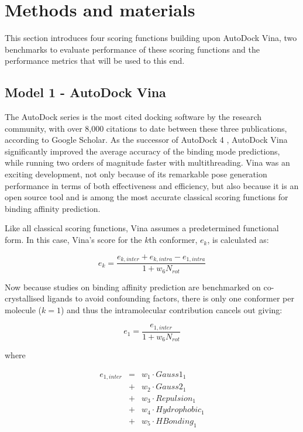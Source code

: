 \section{Methods and materials}

This section introduces four scoring functions building upon AutoDock Vina, two benchmarks to evaluate performance of these scoring functions and the performance metrics that will be used to this end.

\subsection{Model 1 - AutoDock Vina}

The AutoDock series \citep{597,596,595} is the most cited docking software by the research community, with over 8,000 citations to date between these three publications, according to Google Scholar. As the successor of AutoDock 4 \citep{596}, AutoDock Vina \citep{595} significantly improved the average accuracy of the binding mode predictions, while running two orders of magnitude faster with multithreading. Vina was an exciting development, not only because of its remarkable pose generation performance in terms of both effectiveness and efficiency, but also because it is an open source tool and is among the most accurate classical scoring functions for binding affinity prediction.

Like all classical scoring functions, Vina assumes a predetermined functional form. In this case, Vina's score for the $k$th conformer, $e_k$, is calculated as:

\begin{equation}
\label{rfscore3:e_k}
e_k=\frac{e_{k,inter}+e_{k,intra}-e_{1,intra}}{1+w_6N_{rot}}
\end{equation}

Now because studies on binding affinity prediction are benchmarked on co-crystallised ligands to avoid confounding factors, there is only one conformer per molecule ($k=1$) and thus the intramolecular contribution cancels out giving:

\begin{equation}
\label{rfscore3:e_1}
e_1=\frac{e_{1,inter}}{1+w_6N_{rot}}
\end{equation}

where

\begin{eqnarray}
\label{rfscore3:e_1_inter}
e_{1,inter} &=& w_1 \cdot Gauss1_1 \nonumber \\
            &+& w_2 \cdot Gauss2_1 \nonumber \\
		    &+& w_3 \cdot Repulsion_1 \nonumber \\
		    &+& w_4 \cdot Hydrophobic_1 \nonumber \\
		    &+& w_5 \cdot HBonding_1
\end{eqnarray}

